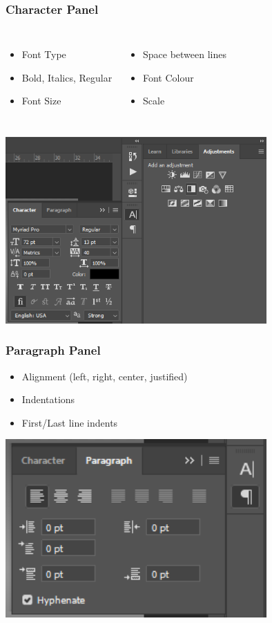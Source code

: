 \documentclass{beamer}
\begin{document}
\begin{frame}
	\frametitle{Character Panel}
	\begin{columns}
	\begin{itemize}
		\item Font Type
		\item Bold, Italics, Regular
		\item Font Size
	\end{itemize}
	\begin{itemize}
	\item Space between lines
	\item Font Colour
	\item Scale
\end{itemize}
\end{columns}
	\begin{center}
		\includegraphics[width = 0.75\textwidth]{images/character panel.png}
	\end{center}
\end{frame}

\begin{frame}
	\frametitle{Paragraph Panel}
	\begin{itemize}
		\item Alignment (left, right, center, justified)
		\item Indentations
		\item First/Last line indents
	\end{itemize}
	\begin{center}
		\includegraphics[width = 0.75\textwidth]{images/paragraph panel.png}
	\end{center}
\end{frame}
		
\end{document}
